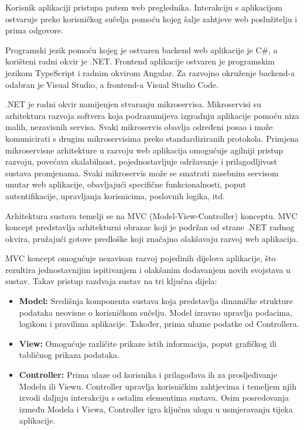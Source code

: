 			{Korisnik aplikaciji pristupa putem web preglednika. Interakciju s aplikacijom ostvaruje preko korisničkog sučelja pomoću kojeg šalje zahtjeve web poslužitelju i prima odgovore.
				
				Programski jezik pomoću kojeg je ostvaren backend web aplikacije je C\#, a korišteni radni okvir je .NET. Frontend aplikacije ostvaren je programskim jezikom
				TypeScript i radnim okvirom Angular. Za razvojno okruženje backend-a odabran je Visual Studio, a frontend-a Visual Studio Code.
				
				.NET je radni okvir namijenjen stvaranju mikroservisa. Mikroservisi su arhitektura razvoja softvera koja podrazumijeva izgradnju aplikacije pomoću niza malih, nezavisnih servisa. Svaki mikroservis obavlja određeni posao i može komunicirati s drugim mikroservisima preko standardiziranih protokola. Primjena mikroservisne arhitekture u razvoju web aplikacija omogućuje agilniji pristup razvoju, povećava skalabilnost, pojednostavljuje održavanje i prilagodljivost sustava promjenama. Svaki mikroservis može se smatrati zasebnim servisom unutar web aplikacije, obavljajući specifične funkcionalnosti, poput autentifikacije, upravljanja korisnicima, poslovnih logika, itd.
				
				Arhitektura sustava temelji se na MVC (Model-View-Controller) konceptu. MVC koncept predstavlja arhitekturni obrazac koji je podržan od strane .NET radnog okvira, pružajući gotove predloške koji značajno olakšavaju razvoj web aplikacija.
				
				MVC koncept omogućuje nezavisan razvoj pojedinih dijelova aplikacije, što rezultira jednostavnijim ispitivanjem i olakšanim dodavanjem novih svojstava u sustav. Takav pristup razdvaja sustav na tri ključna dijela:
				
				\begin{itemize}
					\item \textbf{Model:} Središnja komponenta sustava koja predstavlja dinamičke strukture podataka neovisne o korisničkom sučelju. Model izravno upravlja podacima, logikom i pravilima aplikacije. Također, prima ulazne podatke od Controllera.
					
					\item \textbf{View:} Omogućuje različite prikaze istih informacija, poput grafičkog ili tabličnog prikaza podataka.
					
					\item \textbf{Controller:} Prima ulaze od korisnika i prilagođava ih za prosljeđivanje Modelu ili Viewu. Controller upravlja korisničkim zahtjevima i temeljem njih izvodi daljnju interakciju s ostalim elementima sustava. Osim posredovanja između Modela i Viewa, Controller igra ključnu ulogu u usmjeravanju tijeka aplikacije.
				\end{itemize}
				
}
